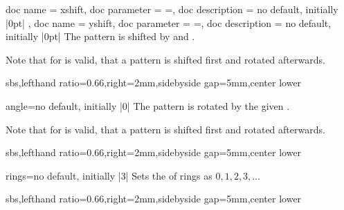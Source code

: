 \documentclass[a4paper,11pt]{article}
\begin{document}
\begin{docPatternKeys}
  {
    {
      doc name        = xshift,
      doc parameter   = {=},
      doc description = {no default, initially |0pt|}
    },
    {
      doc name        = yshift,
      doc parameter   = {=},
      doc description = {no default, initially |0pt|}
    }
  }
  The pattern is shifted by  and .
  \par
  Note that for  is valid, that a pattern is shifted first and rotated afterwards.
\begin{dispExample*}{sbs,lefthand ratio=0.66,right=2mm,sidebyside gap=5mm,center lower}
\end{dispExample*}
\end{docPatternKeys}


\begin{docPatternKey}{angle}{=}{no default, initially |0|}
  The pattern is rotated by the given .
  \par
  Note that for  is valid, that a pattern is shifted first and rotated afterwards.
\begin{dispExample*}{sbs,lefthand ratio=0.66,right=2mm,sidebyside gap=5mm,center lower}
\end{dispExample*}
\end{docPatternKey}


\clearpage


\begin{docPatternKey}{rings}{=}{no default, initially |3|}
  Sets the  of rings as $0, 1, 2, 3, \ldots$

\begin{dispExample*}{sbs,lefthand ratio=0.66,right=2mm,sidebyside gap=5mm,center lower}
\end{dispExample*}
\end{docPatternKey}
\end{document}
